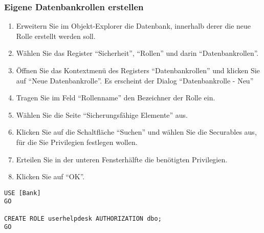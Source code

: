         \subsubsection{Eigene Datenbankrollen erstellen}
          \begin{enumerate}
              \item Erweitern Sie im Objekt-Explorer die Datenbank, innerhalb
              derer die neue Rolle erstellt werden soll.
              \item Wählen Sie das Register \enquote{Sicherheit},
              \enquote{Rollen} und darin \enquote{Datenbankrollen}.
              \item Öffnen Sie das Kontextmenü des Registers
              \enquote{Datenbankrollen} und klicken Sie auf \enquote{Neue
              Datenbankrolle}. Es erscheint der Dialog \enquote{Datenbankrolle
              - Neu}
              \item Tragen Sie im Feld \enquote{Rollenname} den Bezeichner der
              Rolle ein.
              \item Wählen Sie die Seite \enquote{Sicherungsfähige Elemente}
              aus.
              \item Klicken Sie auf die Schaltfläche \enquote{Suchen} und wählen
              Sie die Securables aus, für die Sie Privilegien festlegen
              wollen.
              \item Erteilen Sie in der unteren Fensterhälfte die benötigten
              Privilegien.
              \item Klicken Sie auf \enquote{OK}.
          \end{enumerate}
           \begin{lstlisting}[language=ms_sql, caption={Erstellen einer
           Datenbankrolle}, label=admin19_09]
USE [Bank]
GO

CREATE ROLE userhelpdesk AUTHORIZATION dbo;
GO
        \end{lstlisting}
          \begin{literaturinternet}
            \item \cite{ms187936}
          \end{literaturinternet}
